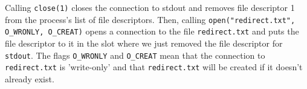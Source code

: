 \documentclass[11pt, letterpaper]{article}
\begin{document}
Calling \texttt{close(1)} closes the connection to {stdout} and removes file descriptor 1 from the process's list of file descriptors.  Then, calling \texttt{open("redirect.txt", O_WRONLY, O_CREAT)} opens a connection to the file \texttt{redirect.txt} and puts the file descriptor to it in the slot where we just removed the file descriptor for \texttt{stdout}.  The flags \texttt{O_WRONLY} and \texttt{O_CREAT} mean that the connection to \texttt{redirect.txt} is 'write-only' and that \texttt{redirect.txt} will be created if it doesn't already exist.
\end{document}
